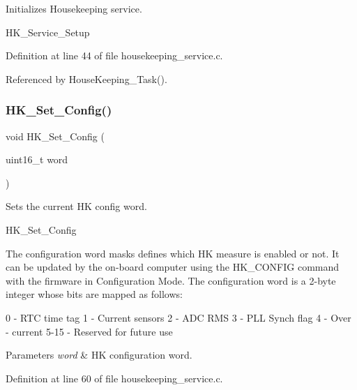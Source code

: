 Initializes Housekeeping service. 

H\+K\+\_\+\+Service\+\_\+\+Setup 

Definition at line 44 of file housekeeping\+\_\+service.\+c.



Referenced by House\+Keeping\+\_\+\+Task().

\mbox{\label{group___housekeeping___service_ga4df6d95ad8240c83fae869b1cdf25c5e}} 
\subsubsection{\texorpdfstring{H\+K\+\_\+\+Set\+\_\+\+Config()}{HK\_Set\_Config()}}
{\footnotesize\ttfamily void H\+K\+\_\+\+Set\+\_\+\+Config (\begin{DoxyParamCaption}\item[{uint16\+\_\+t}]{word }\end{DoxyParamCaption})}



Sets the current HK config word. 

H\+K\+\_\+\+Set\+\_\+\+Config

The configuration word masks defines which HK measure is enabled or not. It can be updated by the on-\/board computer using the H\+K\+\_\+\+C\+O\+N\+F\+IG command with the firmware in Configuration Mode. The configuration word is a 2-\/byte integer whose bits are mapped as follows\+: 
\begin{DoxyPre}
0 - RTC time tag
1 - Current sensors
2 - ADC RMS
3 - PLL Synch flag
4 - Over - current
5-15 - Reserved for future use
\end{DoxyPre}



\begin{DoxyParams}{Parameters}
{\em word} & HK configuration word. \\
\hline
\end{DoxyParams}


Definition at line 60 of file housekeeping\+\_\+service.\+c.

\mbox{\label{group___housekeeping___service_gafc2f4843a1264e16569eed48653b9d5c}} 
